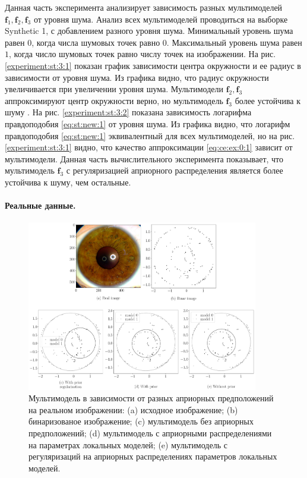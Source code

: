 Данная часть эксперимента анализирует зависимость разных мультимоделей $\textbf{f}_1, \textbf{f}_2, \textbf{f}_3$ от уровня шума. 
Анализ всех мультимоделей проводиться на выборке Synthetic 1, с добавлением разного уровня шума.
Минимальный уровень шума равен $0$, когда числа шумовых точек равно $0$. Максимальный уровень шума равен $1$, когда число шумовых точек равно числу точек на изображении.
На рис. \ref{experiment:st:3:1} показан график зависимости центра окружности и ее радиус в зависимости от уровня шума. Из графика видно, что радиус окружности увеличивается при увеличении уровня шума. 
Мультимодели $\textbf{f}_2, \textbf{f}_3$ аппроксимируют центр окружности верно, но мультимодель $\textbf{f}_3$ более устойчива к шуму .
На рис. \ref{experiment:st:3:2} показана зависимость логарифма правдоподобия \eqref{eq:st:new:1} от уровня шума. 
Из графика видно, что логарифм правдоподобия \eqref{eq:st:new:1} эквивалентный для всех мультимоделей, но на рис. \ref{experiment:st:3:1} видно, что качество аппроксимации \eqref{eq:ce:ex:0:1} зависит от мультимодели.
Данная часть вычислительного эксперимента показывает, что мультимодель $\textbf{f}_3$ с регуляризацией априорного распределения является более устойчива к шуму, чем остальные.

\paragraph{Реальные данные.}
\begin{figure}[h!t]\center
\includegraphics[width=0.9\textwidth]{results/priorexpert/experiment_real_compare}
\caption{Мультимодель в зависимости от разных априорных предположений на реальном изображении: (a) исходное изображение; (b) бинаризованое изображение; (c) мультимодель без априорных предположений; (d) мультимодель с априорными распределениями на параметрах локальных моделей; (e) мультимодель с регуляризаций на априорных распределениях параметров локальных моделей.}
\label{experiment:2}
\end{figure}

